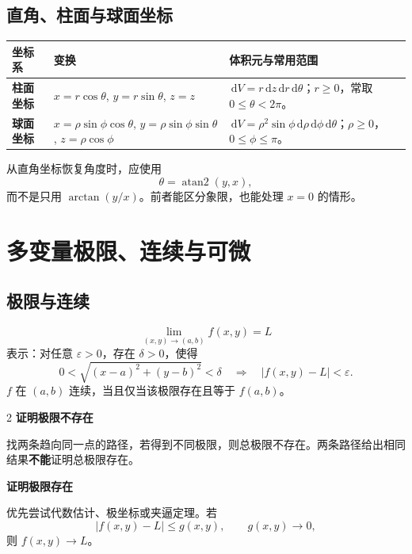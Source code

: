 \documentclass[UTF8,a4paper,10pt,fontset=fandol]{ctexart}
\newcommand{\dd}{\,\mathrm{d}}
\begin{document}
\subsection{直角、柱面与球面坐标}

\begin{center}
\begin{tabularx}{\textwidth}{>{\bfseries}p{25mm} X X}
\toprule
坐标系 & 变换 & 体积元与常用范围 \\
\midrule
柱面坐标
& $x=r\cos\theta$, $y=r\sin\theta$, $z=z$
& $\dd V=r\dd z\dd r\dd\theta$；$r\ge0$，常取 $0\le\theta<2\pi$。 \\
球面坐标
& $x=\rho\sin\phi\cos\theta$, $y=\rho\sin\phi\sin\theta$, $z=\rho\cos\phi$
& $\dd V=\rho^2\sin\phi\dd\rho\dd\phi\dd\theta$；$\rho\ge0$，$0\le\phi\le\pi$。 \\
\bottomrule
\end{tabularx}
\end{center}

从直角坐标恢复角度时，应使用
\[
\theta=\operatorname{atan2}(y,x),
\]
而不是只用 $\arctan(y/x)$。前者能区分象限，也能处理 $x=0$ 的情形。

\section{多变量极限、连续与可微}

\subsection{极限与连续}

\begin{concept}[二维极限的定义]
\[
\lim_{(x,y)\to(a,b)}f(x,y)=L
\]
表示：对任意 $\varepsilon>0$，存在 $\delta>0$，使得
\[
0<\sqrt{(x-a)^2+(y-b)^2}<\delta
\quad\Longrightarrow\quad
|f(x,y)-L|<\varepsilon.
\]
$f$ 在 $(a,b)$ 连续，当且仅当该极限存在且等于 $f(a,b)$。
\end{concept}

\begin{multicols}{2}
\textbf{证明极限不存在}

找两条趋向同一点的路径，若得到不同极限，则总极限不存在。两条路径给出相同结果\textbf{不能}证明总极限存在。

\columnbreak
\textbf{证明极限存在}

优先尝试代数估计、极坐标或夹逼定理。若
\[
|f(x,y)-L|\le g(x,y),
\qquad g(x,y)\to0,
\]
则 $f(x,y)\to L$。
\end{multicols}

\end{document}
